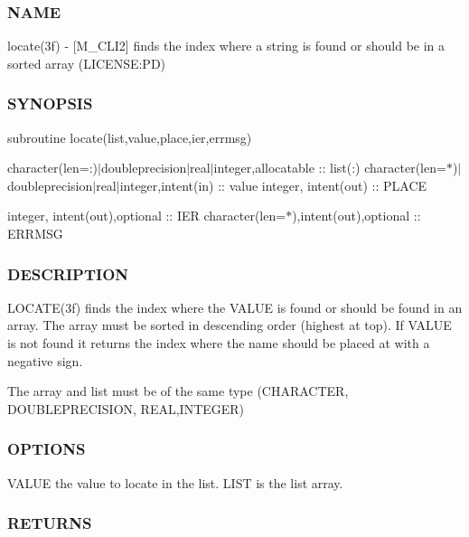 \subsubsection*{N\+A\+ME}

locate(3f) -\/ \mbox{[}M\+\_\+\+C\+L\+I2\mbox{]} finds the index where a string is found or should be in a sorted array (L\+I\+C\+E\+N\+SE\+:PD) 

\subsubsection*{S\+Y\+N\+O\+P\+S\+IS}

subroutine locate(list,value,place,ier,errmsg)

character(len=\+:)$\vert$doubleprecision$\vert$real$\vert$integer,allocatable \+:\+: list(\+:) character(len=$\ast$)$\vert$doubleprecision$\vert$real$\vert$integer,intent(in) \+:\+: value integer, intent(out) \+:\+: P\+L\+A\+CE

integer, intent(out),optional \+:\+: I\+ER character(len=$\ast$),intent(out),optional \+:\+: E\+R\+R\+M\+SG

\subsubsection*{D\+E\+S\+C\+R\+I\+P\+T\+I\+ON}

\begin{DoxyVerb}LOCATE(3f) finds the index where the VALUE is found or should
be found in an array. The array must be sorted in descending
order (highest at top). If VALUE is not found it returns the index
where the name should be placed at with a negative sign.

The array and list must be of the same type (CHARACTER, DOUBLEPRECISION,
REAL,INTEGER)
\end{DoxyVerb}


\subsubsection*{O\+P\+T\+I\+O\+NS}

\begin{DoxyVerb}VALUE         the value to locate in the list.
LIST          is the list array.
\end{DoxyVerb}


\subsubsection*{R\+E\+T\+U\+R\+NS}

